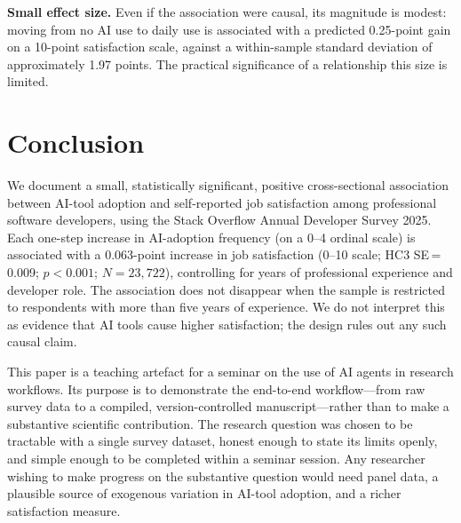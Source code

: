 \documentclass[11pt]{article}
\begin{document}
\textbf{Small effect size.}
Even if the association were causal, its magnitude is modest: moving from
no AI use to daily use is associated with a predicted 0.25-point gain on
a 10-point satisfaction scale, against a within-sample standard deviation
of approximately 1.97 points. The practical significance of a
relationship this size is limited.

\section{Conclusion}

We document a small, statistically significant, positive cross-sectional
association between AI-tool adoption and self-reported job satisfaction
among professional software developers, using the Stack Overflow Annual
Developer Survey 2025. Each one-step increase in AI-adoption frequency
(on a 0--4 ordinal scale) is associated with a 0.063-point increase in
job satisfaction (0--10 scale; HC3 SE\,=\,0.009; $p < 0.001$;
$N = 23{,}722$), controlling for years of professional experience and
developer role. The association does not disappear when the sample is
restricted to respondents with more than five years of experience.
We do not interpret this as evidence that AI tools cause higher
satisfaction; the design rules out any such causal claim.

This paper is a teaching artefact for a seminar on the use of AI agents
in research workflows. Its purpose is to demonstrate the end-to-end
workflow---from raw survey data to a compiled, version-controlled
manuscript---rather than to make a substantive scientific contribution.
The research question was chosen to be tractable with a single survey
dataset, honest enough to state its limits openly, and simple enough
to be completed within a seminar session. Any researcher wishing to make
progress on the substantive question would need panel data, a plausible
source of exogenous variation in AI-tool adoption, and a richer
satisfaction measure.



\end{document}
